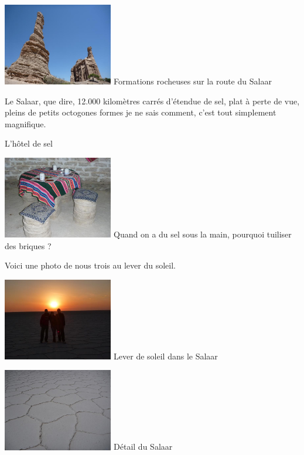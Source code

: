 \begin{multicols}{2}
\hspace*{-0.65cm}
\includegraphics[width=4.8cm]{articles/La-paz-humahuaca-et-salaar/1257387285NQRd.jpg}
Formations rocheuses sur la route du Salaar

Le Salaar, que dire, 12.000 kilomètres carrés d'étendue de sel, plat à perte de vue, pleins de petits octogones formes je ne sais comment, c'est tout simplement magnifique.

L'hôtel de sel

\hspace*{-0.65cm}
\includegraphics[width=4.8cm]{articles/La-paz-humahuaca-et-salaar/12573872732dVv.jpg}
Quand on a du sel sous la main, pourquoi tuiliser des briques ?

Voici une photo de nous trois au lever du soleil.

\hspace*{-0.65cm}
\includegraphics[width=4.8cm]{articles/La-paz-humahuaca-et-salaar/1257203731jBS0.jpg}
Lever de soleil dans le Salaar

\hspace*{-0.65cm}
\includegraphics[width=4.8cm]{articles/La-paz-humahuaca-et-salaar/1257389754e5dq.jpg}
Détail du Salaar


\end{multicols}
